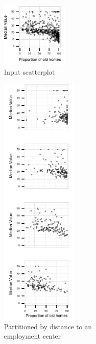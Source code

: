 
\begin{figure}
 \centering 
    \begin{subfigure}[t]{1.3in}
        \includegraphics[width=1.3in]{images/AGE-MEDV.pdf}
        \caption{Input scatterplot}
        \label{fig:method_original}
    \end{subfigure}
    \begin{subfigure}[t]{1.5in}
  	\includegraphics[width=1.5in]{images/DIS.pdf}
	\caption{Partitioned by distance to an\\ employment center}
	 \label{fig:method_actual}
    \end{subfigure}
    \begin{subfigure}[t]{1.5in}

\end{subfigure}
\end{figure}
